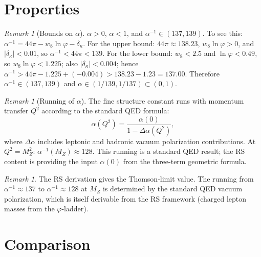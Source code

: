 \documentclass[12pt,a4paper]{article}
\theoremstyle{definition}
\theoremstyle{remark}
\newtheorem{remark}[theorem]{Remark}
\begin{document}
\section{Properties}
\label{sec:properties}

\begin{remark}[Bounds on $\alpha$]
\label{thm:bounds}
$\alpha > 0$, $\alpha < 1$, and
$\alpha^{-1} \in (137, 139)$.
To see this: $\alpha^{-1} = 44\pi - w_8\ln\varphi - \delta_\kappa$.
For the upper bound: $44\pi \approx 138.23$, $w_8\ln\varphi > 0$,
and $|\delta_\kappa| < 0.01$, so $\alpha^{-1} < 44\pi < 139$.
For the lower bound: $w_8 < 2.5$ and $\ln\varphi < 0.49$, so
$w_8\ln\varphi < 1.225$; also $|\delta_\kappa| < 0.004$; hence
$\alpha^{-1} > 44\pi - 1.225 + (-0.004) > 138.23 - 1.23 = 137.00$.
Therefore $\alpha^{-1} \in (137, 139)$ and $\alpha \in (1/139, 1/137)
\subset (0, 1)$.
\end{remark}

\begin{remark}[Running of $\alpha$]
\label{thm:running}
The fine structure constant runs with momentum transfer $Q^2$
according to the standard QED formula:
\begin{equation}
  \alpha(Q^2) = \frac{\alpha(0)}
  {1 - \Delta\alpha(Q^2)},
\end{equation}
where $\Delta\alpha$ includes leptonic and hadronic vacuum
polarization contributions.  At $Q^2 = M_Z^2$:
$\alpha^{-1}(M_Z) \approx 128$.  This running is a standard QED
result; the RS content is providing the input $\alpha(0)$ from
the three-term geometric formula.
\end{remark}

\begin{remark}
The RS derivation gives the Thomson-limit value.  The running
from $\alpha^{-1} \approx 137$ to $\alpha^{-1} \approx 128$ at
$M_Z$ is determined by the standard QED vacuum polarization, which
is itself derivable from the RS framework (charged lepton masses
from the $\varphi$-ladder).
\end{remark}

\section{Comparison}
\label{sec:comparison}
\end{document}
